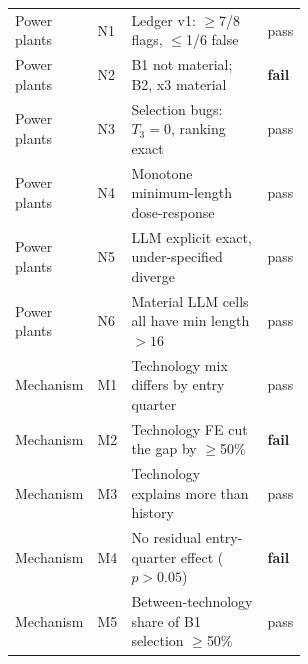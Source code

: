 \begin{longtable}{llp{0.58\linewidth}l}
Power plants & N1 & Ledger v1: $\ge$7/8 flags, $\le$1/6 false & pass \\
Power plants & N2 & B1 not material; B2, x3 material & \textbf{fail} \\
Power plants & N3 & Selection bugs: $T_3=0$, ranking exact & pass \\
Power plants & N4 & Monotone minimum-length dose-response & pass \\
Power plants & N5 & LLM explicit exact, under-specified diverge & pass \\
Power plants & N6 & Material LLM cells all have min length $>16$ & pass \\
Mechanism & M1 & Technology mix differs by entry quarter & pass \\
Mechanism & M2 & Technology FE cut the gap by $\ge$50\% & \textbf{fail} \\
Mechanism & M3 & Technology explains more than history & pass \\
Mechanism & M4 & No residual entry-quarter effect ($p>0.05$) & \textbf{fail} \\
Mechanism & M5 & Between-technology share of B1 selection $\ge$50\% & pass \\
\bottomrule
\end{longtable}
